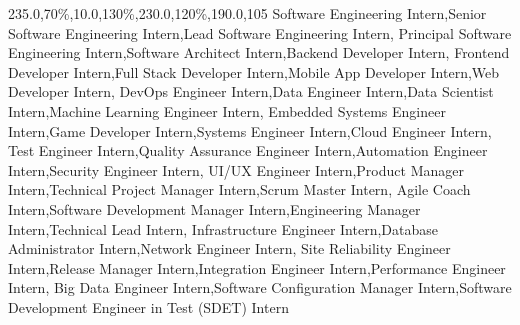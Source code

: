\documentclass[letterpaper,11pt]{article}
\begin{document}
\begin{spacing}{0.1}
{    235.0,70\%,10.0,130\%,230.0,120\%,190.0,105}
    \scalebox{0.1}
    {Software Engineering Intern,Senior Software Engineering Intern,Lead Software Engineering Intern,
    Principal Software Engineering Intern,Software Architect Intern,Backend Developer Intern,
    Frontend Developer Intern,Full Stack Developer Intern,Mobile App Developer Intern,Web Developer Intern,
    DevOps Engineer Intern,Data Engineer Intern,Data Scientist Intern,Machine Learning Engineer Intern,
    Embedded Systems Engineer Intern,Game Developer Intern,Systems Engineer Intern,Cloud Engineer Intern,
    Test Engineer Intern,Quality Assurance Engineer Intern,Automation Engineer Intern,Security Engineer Intern,
    UI/UX Engineer Intern,Product Manager Intern,Technical Project Manager Intern,Scrum Master Intern,
    Agile Coach Intern,Software Development Manager Intern,Engineering Manager Intern,Technical Lead Intern,
    Infrastructure Engineer Intern,Database Administrator Intern,Network Engineer Intern,
    Site Reliability Engineer Intern,Release Manager Intern,Integration Engineer Intern,Performance Engineer Intern,
    Big Data Engineer Intern,Software Configuration Manager Intern,Software Development Engineer in Test (SDET) Intern}
\end{spacing}
\end{document}
